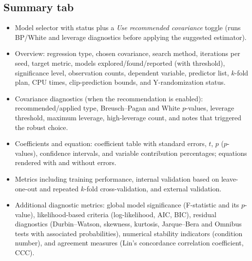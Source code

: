 \documentclass[11pt,a4paper]{article}
\begin{document}
\subsection{\textbf{Summary} tab}
\begin{itemize}
  \item Model selector with status plus a \emph{Use recommended covariance} toggle (runs BP/White and leverage diagnostics before applying the suggested estimator).
  \item Overview: regression type, chosen covariance, search method, iterations per seed, target metric, models explored/found/reported (with threshold), significance level, observation counts, dependent variable, predictor list, $k$-fold plan, CPU times, clip-prediction bounds, and Y-randomization status.
  \item Covariance diagnostics (when the recommendation is enabled): recommended/applied type, Breusch--Pagan and White $p$-values, leverage threshold, maximum leverage, high-leverage count, and notes that triggered the robust choice.
  \item Coefficients and equation: coefficient table with standard errors, $t$, $p$ ($p$-values), confidence intervals, and variable contribution percentages; equations rendered with and without errors.
  \item Metrics including training performance, internal validation based on leave-one-out and repeated $k$-fold cross-validation, and external validation.
  \item Additional diagnostic metrics: global model significance (F-statistic and its $p$-value), likelihood-based criteria (log-likelihood, AIC, BIC), residual diagnostics (Durbin--Watson, skewness, kurtosis, Jarque--Bera and Omnibus tests with associated probabilities), numerical stability indicators (condition number), and agreement measures (Lin’s concordance correlation coefficient, CCC).
\end{itemize}
\end{document}
